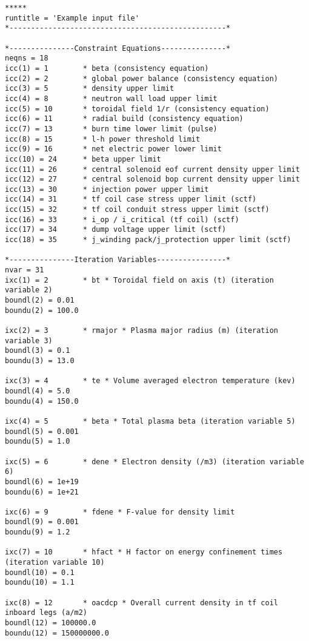 \documentclass[11pt,a4paper]{report}
\begin{document}
\footnotesize
\begin{verbatim}
*****
runtitle = 'Example input file'
*--------------------------------------------------*

*---------------Constraint Equations---------------*
neqns = 18       
icc(1) = 1        * beta (consistency equation)
icc(2) = 2        * global power balance (consistency equation)
icc(3) = 5        * density upper limit
icc(4) = 8        * neutron wall load upper limit
icc(5) = 10       * toroidal field 1/r (consistency equation)
icc(6) = 11       * radial build (consistency equation)
icc(7) = 13       * burn time lower limit (pulse)
icc(8) = 15       * l-h power threshold limit
icc(9) = 16       * net electric power lower limit
icc(10) = 24      * beta upper limit
icc(11) = 26      * central solenoid eof current density upper limit
icc(12) = 27      * central solenoid bop current density upper limit
icc(13) = 30      * injection power upper limit
icc(14) = 31      * tf coil case stress upper limit (sctf)
icc(15) = 32      * tf coil conduit stress upper limit (sctf)
icc(16) = 33      * i_op / i_critical (tf coil) (sctf)
icc(17) = 34      * dump voltage upper limit (sctf)
icc(18) = 35      * j_winding pack/j_protection upper limit (sctf)

*---------------Iteration Variables----------------*
nvar = 31        
ixc(1) = 2        * bt * Toroidal field on axis (t) (iteration variable 2)
boundl(2) = 0.01  
boundu(2) = 100.0  

ixc(2) = 3        * rmajor * Plasma major radius (m) (iteration variable 3)
boundl(3) = 0.1  
boundu(3) = 13.0  

ixc(3) = 4        * te * Volume averaged electron temperature (kev)
boundl(4) = 5.0  
boundu(4) = 150.0  

ixc(4) = 5        * beta * Total plasma beta (iteration variable 5)
boundl(5) = 0.001  
boundu(5) = 1.0  

ixc(5) = 6        * dene * Electron density (/m3) (iteration variable 6)
boundl(6) = 1e+19  
boundu(6) = 1e+21  

ixc(6) = 9        * fdene * F-value for density limit
boundl(9) = 0.001  
boundu(9) = 1.2  

ixc(7) = 10       * hfact * H factor on energy confinement times (iteration variable 10)
boundl(10) = 0.1  
boundu(10) = 1.1  

ixc(8) = 12       * oacdcp * Overall current density in tf coil inboard legs (a/m2)
boundl(12) = 100000.0  
boundu(12) = 150000000.0  


\end{verbatim}
\end{document}
